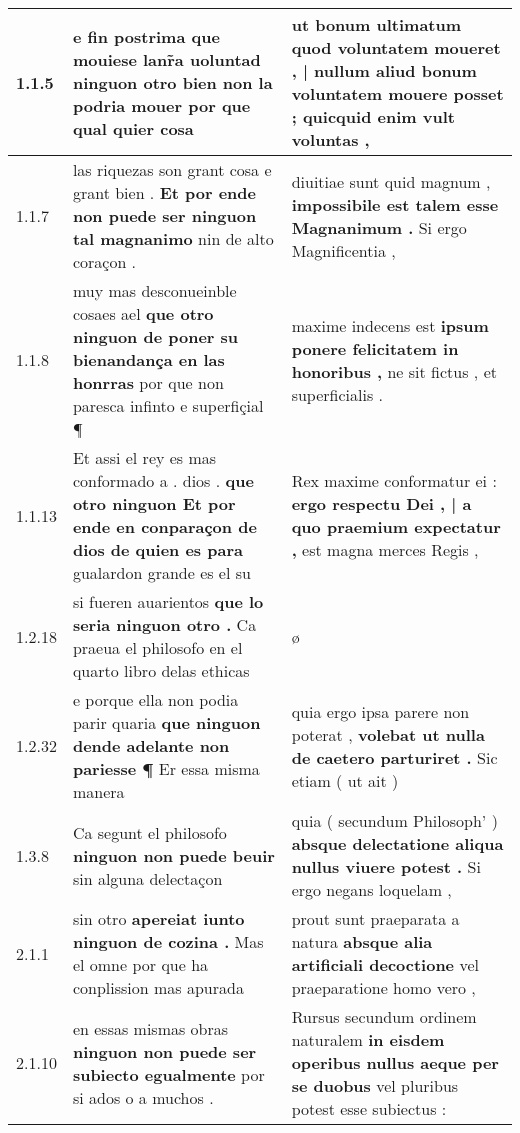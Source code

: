 \begin{tabular}{|p{1cm}|p{6.5cm}|p{6.5cm}|}

\hline
1.1.5 & e fin postrima \textbf{ que mouiese lanr̃a uoluntad ninguon otro bien non la podria mouer } por que qual quier cosa & ut bonum ultimatum \textbf{ quod voluntatem moueret , | nullum aliud bonum voluntatem mouere posset ; } quicquid enim vult voluntas , \\\hline
1.1.7 & las riquezas son grant cosa e grant bien . \textbf{ Et por ende non puede ser ninguon tal magnanimo } nin de alto coraçon . & diuitiae sunt quid magnum , \textbf{ impossibile est talem esse Magnanimum . } Si ergo Magnificentia , \\\hline
1.1.8 & muy mas desconueinble cosaes ael \textbf{ que otro ninguon de poner su bienandança en las honrras } por que non paresca infinto e superfiçial ¶ & maxime indecens est \textbf{ ipsum ponere felicitatem in honoribus , } ne sit fictus , et superficialis . \\\hline
1.1.13 & Et assi el rey es mas conformado a . dios . \textbf{ que otro ninguon Et por ende en conparaçon de dios de quien es para } gualardon grande es el su & Rex maxime conformatur ei : \textbf{ ergo respectu Dei , | a quo praemium expectatur , } est magna merces Regis , \\\hline
1.2.18 & si fueren auarientos \textbf{ que lo seria ninguon otro . } Ca praeua el philosofo en el quarto libro delas ethicas & ø \\\hline
1.2.32 & e porque ella non podia parir quaria \textbf{ que ninguon dende adelante non pariesse ¶ } Er essa misma manera & quia ergo ipsa parere non poterat , \textbf{ volebat ut nulla de caetero parturiret . } Sic etiam ( ut ait ) \\\hline
1.3.8 & Ca segunt el philosofo \textbf{ ninguon non puede beuir } sin alguna delectaçon & quia ( secundum Philosoph’ ) \textbf{ absque delectatione aliqua nullus viuere potest . } Si ergo negans loquelam , \\\hline
2.1.1 & sin otro \textbf{ apereiat iunto ninguon de cozina . } Mas el omne por que ha conplission mas apurada & prout sunt praeparata a natura \textbf{ absque alia artificiali decoctione } vel praeparatione homo vero , \\\hline
2.1.10 & en essas mismas obras \textbf{ ninguon non puede ser subiecto egualmente } por si ados o a muchos . & Rursus secundum ordinem naturalem \textbf{ in eisdem operibus nullus aeque per se duobus } vel pluribus potest esse subiectus : \\\hline

\end{tabular}
